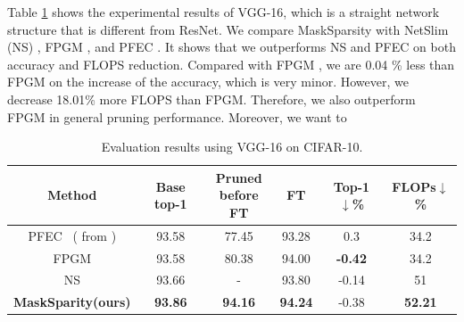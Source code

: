 \documentclass[review]{cvpr}
\begin{document}
Table \ref{exp-table-cifar10-VGG16} shows the experimental results of VGG-16, which is a straight network structure that is different from ResNet. We compare MaskSparsity with NetSlim (NS) \cite{liu2017learning}, FPGM \cite{FPGM}, and PFEC \cite{li2016pruning}. It shows that we outperforms NS \cite{liu2017learning} and PFEC \cite{li2016pruning} on both accuracy and FLOPS reduction. Compared with FPGM \cite{FPGM}, we are 0.04 \% less than FPGM on the increase of the accuracy, which is very minor. However, we decrease 18.01\% more FLOPS than FPGM. Therefore, we also outperform FPGM in general pruning performance. Moreover, we want to 


\begin{table}[ht]
	\caption{Evaluation results using VGG-16 on CIFAR-10.}
	\vspace{+0.2em}
	\footnotesize
	\setlength{\tabcolsep}{0.1em}
	\begin{center}
		\begin{tabular}{cccccc}
			\hline
			
		Method 			&Base top-1		&\shortstack {Pruned\\before FT} &FT	& Top-1 $\downarrow$\% 	&FLOPs$\downarrow$\% \\ 
		\hline
		
		PFEC~\cite{li2016pruning} {\scriptsize{( from \cite{FPGM})}}   & 93.58  &77.45 & 93.28 & 0.3  &34.2\\  
		
		FPGM \cite{FPGM}   & 93.58  &80.38 & 94.00  &\textbf{-0.42} &34.2\\  
		
		NS \cite{liu2017learning} & 93.66 &-  & 93.80  &-0.14 &51\\  
		
    	\textbf{MaskSparity(ours)}                &\textbf{93.86}   &\textbf{94.16} &\textbf{94.24} &-0.38 & \textbf{52.21}\\ 
			
		
		    
			\hline
		
		\end{tabular}
	\end{center}
	\label{exp-table-cifar10-VGG16}
\end{table}
\end{document}
